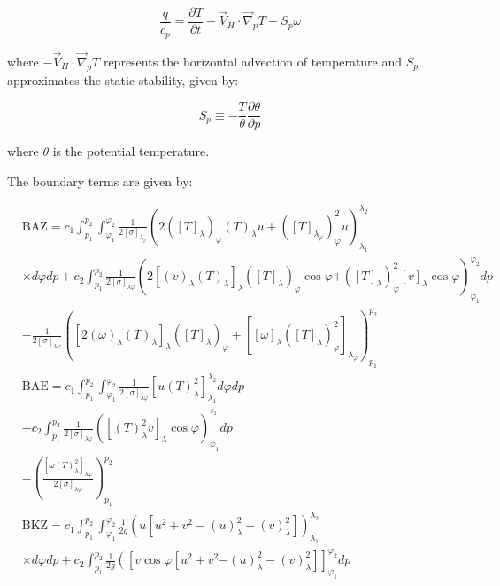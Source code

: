 \documentclass[pdflatex,sn-chicago]{sn-jnl}%
\theoremstyle{plain}
\theoremstyle{definition}
\theoremstyle{remark}
\theoremstyle{definition}
\begin{document}
\begin{equation}
    \frac{q}{c_p} = \frac{\partial T}{\partial t} - \Vec{V}_H \cdot \Vec{\nabla}_p T - S_p\omega
\end{equation}

where $-\Vec{V}_H \cdot \Vec{\nabla}_p T$ represents the horizontal advection of temperature and $S_p$ approximates the static stability, given by:

\begin{equation}
    S_p \equiv -\frac{T}{\theta}\frac{\partial \theta}{\partial p}
\end{equation}

where $\theta$ is the potential temperature. 


The boundary terms are given by:

\begin{align}
& \mathrm{BAZ}=c_1 \int_{p_1}^{p_2} \int_{\varphi_1}^{\varphi_2} \frac{1}{2[\sigma]_{\lambda_{\varphi}}}\left(2\left([T]_\lambda\right)_{\varphi}(T)_\lambda u+\left([T]_{\lambda_{\varphi}}\right)_{\varphi}^2 u\right)_{\lambda_1}^{\lambda_2} \nonumber \\
& \times d \varphi d p+c_2 \int_{p_1}^{p_2} \frac{1}{2[\sigma]_{\lambda \varphi}}\left(2\left[(v)_\lambda(T)_\lambda\right]_\lambda\left([T]_\lambda\right)_{\varphi} \cos \varphi \right. \left.+\left([T]_\lambda\right)_{\varphi}^2[v]_\lambda \cos \varphi\right)_{\varphi_1}^{\varphi_2} d p \nonumber \\
& -\frac{1}{2[\sigma]_{\lambda \varphi}}\left(\left[2(\omega)_\lambda(T)_\lambda\right]_\lambda\left([T]_\lambda\right)_{\varphi}+\left[[\omega]_\lambda\left([T]_\lambda\right)_{\varphi}^2\right]_{\lambda_{\varphi}}\right)_{p_1}^{p_2} \\
& \mathrm{BAE}=c_1 \int_{p_1}^{p_2} \int_{\varphi_1}^{\varphi_2} \frac{1}{2[\sigma]_{\lambda \varphi}}\left[u(T)_\lambda^2\right]_{\lambda_1}^{\lambda_2} d \varphi d p \nonumber \\
& +c_2 \int_{p_1}^{p_2} \frac{1}{2[\sigma]_{\lambda \varphi}}\left(\left[(T)_\lambda^2 v\right]_\lambda \cos \varphi\right)_{\varphi_1}^{^{\varphi_2}} d p \\
& -\left(\frac{\left[\omega(T)_\lambda^2\right]_{\lambda \varphi}}{2[\sigma]_{\lambda \varphi}}\right)_{p_1}^{p_2} \nonumber \\
& \mathrm{BKZ}=c_1 \int_{p_1}^{p_2} \int_{\varphi_1}^{\varphi_2} \frac{1}{2 g}\left(u\left[u^2+v^2-(u)_\lambda^2-(v)_\lambda^2\right]\right)_{\lambda_1}^{\lambda_2} \nonumber \\
& \times d \varphi d p+c_2 \int_{p_1}^{p_2} \frac{1}{2 g}\left(\left[v \cos \varphi \left[u^2+v^2\right.\right.\right. \left.\left.-(u)_\lambda^2-(v)_\lambda^2\right]\right]_{\varphi_1}^{\varphi_2} d p  \\

\end{align}
\end{document}
